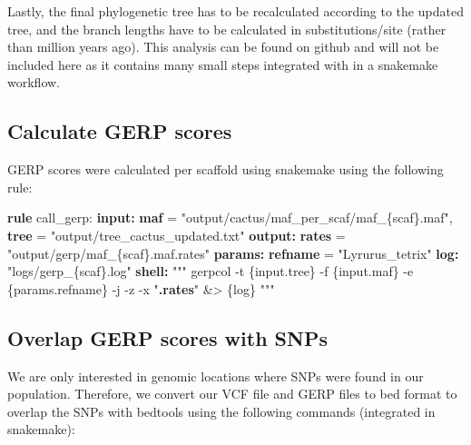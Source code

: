 \documentclass[
  letterpaper,
  DIV=11,
  numbers=noendperiod]{scrreprt}
\newenvironment{Shaded}{}{}
\newcommand{\ExtensionTok}[1]{\textcolor[rgb]{0.84,0.23,0.29}{\textbf{#1}}}
\newcommand{\NormalTok}[1]{\textcolor[rgb]{0.14,0.16,0.18}{#1}}
\newcommand{\StringTok}[1]{\textcolor[rgb]{0.01,0.18,0.38}{#1}}
\begin{document}
Lastly, the final phylogenetic tree has to be recalculated according to
the updated tree, and the branch lengths have to be calculated in
substitutions/site (rather than million years ago). This analysis can be
found on github and will not be included here as it contains many small
steps integrated with in a snakemake workflow.

\subsection{Calculate GERP scores}\label{calculate-gerp-scores}

GERP scores were calculated per scaffold using snakemake using the
following rule:

\begin{Shaded}
\begin{Highlighting}[]
\ExtensionTok{rule}\NormalTok{ call\_gerp:}
    \ExtensionTok{input:}
      \ExtensionTok{maf}\NormalTok{ = }\StringTok{"output/cactus/maf\_per\_scaf/maf\_\{scaf\}.maf"}\NormalTok{,}
      \ExtensionTok{tree}\NormalTok{ = }\StringTok{"output/tree\_cactus\_updated.txt"}
    \ExtensionTok{output:}
      \ExtensionTok{rates}\NormalTok{ = }\StringTok{"output/gerp/maf\_\{scaf\}.maf.rates"}
    \ExtensionTok{params:}
      \ExtensionTok{refname}\NormalTok{ = }\StringTok{"Lyrurus\_tetrix"}
    \ExtensionTok{log:} \StringTok{"logs/gerp\_\{scaf\}.log"}
    \ExtensionTok{shell:}
      \StringTok{"""}
\StringTok{      gerpcol {-}t \{input.tree\} {-}f \{input.maf\} {-}e \{params.refname\} {-}j {-}z {-}x "}\ExtensionTok{.rates}\StringTok{" \&\textgreater{} \{log\}}
\StringTok{      """}
\end{Highlighting}
\end{Shaded}

\subsection{Overlap GERP scores with
SNPs}\label{overlap-gerp-scores-with-snps}

We are only interested in genomic locations where SNPs were found in our
population. Therefore, we convert our VCF file and GERP files to bed
format to overlap the SNPs with bedtools using the following commands
(integrated in snakemake):
\end{document}
